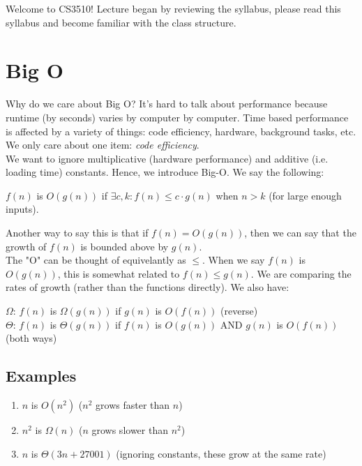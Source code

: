 \documentclass[14pt]{extarticle}
\begin{document}
	\MakeScribeTop

    Welcome to CS3510! Lecture began by reviewing the syllabus, please read
    this syllabus and become familiar with the class structure.

    \section{Big O}
    Why do we care about Big O? It's hard to talk about performance because
    runtime (by seconds) varies by computer by computer. Time based performance
    is affected by a variety of things: code efficiency, hardware, background
    tasks, etc. We only care about one item: \textit{code efficiency}.\\

    We want to ignore multiplicative (hardware performance) and additive (i.e.
    loading time) constants. Hence, we introduce Big-O. We say the following:

    \begin{center}
        $f(n)$ is $O\left(g(n)\right)$ if $\exists c, k: f(n) \leq c\cdot g(n)$
        when $n > k$ (for large enough inputs).
    \end{center}
    Another way to say this is that if $f(n) = O\left(g(n)\right)$, then we can
    say that the growth of $f(n)$ is bounded above by $g(n)$.\\

    The "O" can be thought of equivelantly as $\leq$. When we say $f(n)$ is
    $O\left(g(n)\right)$, this is somewhat related to $f(n) \leq g(n)$. We
    are comparing the rates of growth (rather than the functions directly).
    We also have:
    \begin{center}
        $\Omega$: $f(n)$ is $\Omega\left(g(n)\right)$ if $g(n)$ is
        $O\left(f(n)\right)$ (reverse)\\[2mm]
        $\Theta$: $f(n)$ is $\Theta\left(g(n)\right)$ if $f(n)$ is
        $O\left(g(n)\right)$ AND $g(n)$ is $O\left(f(n)\right)$ (both ways)
    \end{center}

    \pagebreak
    \subsection{Examples}
    \begin{enumerate}
        \item $n$ is $O(n^2)$ ($n^2$ grows faster than $n$)
        \item $n^2$ is $\Omega(n)$ ($n$ grows slower than $n^2$)
        \item $n$ is $\Theta(3n + 27001)$ (ignoring constants, these grow at
            the same rate)
    \end{enumerate}
\end{document}
